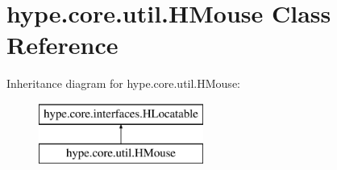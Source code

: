 \hypertarget{classhype_1_1core_1_1util_1_1_h_mouse}{\section{hype.\-core.\-util.\-H\-Mouse Class Reference}
\label{classhype_1_1core_1_1util_1_1_h_mouse}
}
Inheritance diagram for hype.\-core.\-util.\-H\-Mouse\-:\begin{figure}[H]
\begin{center}
\leavevmode
\includegraphics[height=2.000000cm]{classhype_1_1core_1_1util_1_1_h_mouse}
\end{center}
\end{figure}
